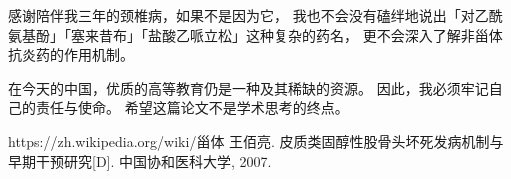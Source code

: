 \documentclass[12pt, a4paper, oneside]{ctexart}
\begin{document}
感谢陪伴我三年的颈椎病，如果不是因为它，
我也不会没有磕绊地说出「对乙酰氨基酚」「塞来昔布」「盐酸乙哌立松」这种复杂的药名，
更不会深入了解非甾体抗炎药的作用机制。

在今天的中国，优质的高等教育仍是一种及其稀缺的资源。
因此，我必须牢记自己的责任与使命。
希望这篇论文不是学术思考的终点。

\begin{thebibliography}{99}

    https://zh.wikipedia.org/wiki/甾体
    王佰亮. 皮质类固醇性股骨头坏死发病机制与早期干预研究[D]. 中国协和医科大学, 2007.
    
\end{thebibliography}
\end{document}
